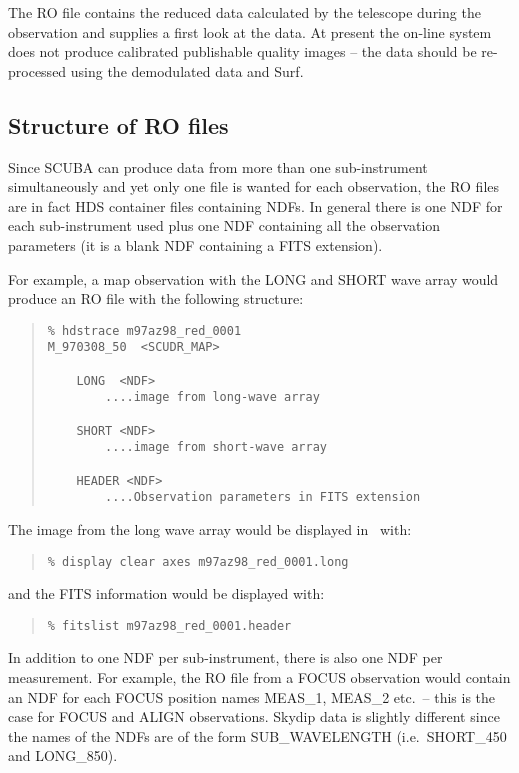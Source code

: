 \documentclass[twoside,11pt]{article}
\newcommand{\scusoft}          {{\sc Surf}}
\newcommand{\Kappa}{\xref{{\sc{Kappa}}}{sun95}{}}
\newenvironment{myquote}{\begin{quote}\begin{small}}{\end{small}\end{quote}}
\newcommand{\xref}[3]{#1}
\begin{document}
The RO file contains the reduced data calculated by the telescope during the
observation and supplies a first look at the data. At present the on-line
system does not produce calibrated publishable quality images -- the data
should be re-processed using the demodulated data and \scusoft.

\subsection{Structure of RO files}

Since SCUBA can produce data from more than one sub-instrument simultaneously
and yet only one file is wanted for each observation, the RO files are in fact
HDS container files containing NDFs. In general there is one NDF for each
sub-instrument used plus one NDF containing all the observation parameters (it
is a blank NDF containing a FITS extension). 

For example, a map observation with the LONG and SHORT wave array would
produce an RO file with the following structure:

\begin{myquote}
\begin{verbatim}
% hdstrace m97az98_red_0001
M_970308_50  <SCUDR_MAP>

    LONG  <NDF>
        ....image from long-wave array

    SHORT <NDF>
        ....image from short-wave array

    HEADER <NDF>
        ....Observation parameters in FITS extension
\end{verbatim}
\end{myquote}


The image from the long wave array would be displayed in \Kappa\
with:
\begin{myquote}
\begin{verbatim}
% display clear axes m97az98_red_0001.long
\end{verbatim}
\end{myquote} 
and the FITS information would be displayed with:
\begin{myquote}
\begin{verbatim}
% fitslist m97az98_red_0001.header
\end{verbatim}
\end{myquote}

In addition to one NDF per sub-instrument, there is also one NDF per
measurement. For example, the RO file from a FOCUS observation would contain
an NDF for each FOCUS position names MEAS\_1, MEAS\_2 etc.\ -- this is the
case for FOCUS and ALIGN observations. Skydip data is slightly different 
since the names of the NDFs are of the form SUB\_WAVELENGTH (i.e.\ SHORT\_450
and LONG\_850).
\end{document}
